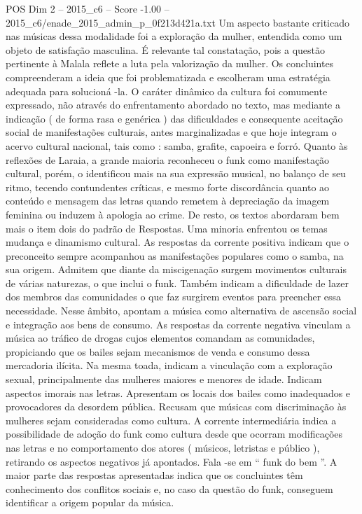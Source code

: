 \begin{textsample}{POS Dim 2 – 2015\_c6 – Score -1.00 – 2015\_c6/enade\_2015\_admin\_p\_0f213d421a.txt}
Um aspecto bastante criticado nas músicas dessa modalidade foi a exploração da mulher, entendida como um objeto de satisfação masculina.
É relevante tal constatação, pois a questão pertinente à Malala reflete a luta pela valorização da mulher.
Os concluintes compreenderam a ideia que foi problematizada e escolheram uma estratégia adequada para solucioná -la.
O caráter dinâmico da cultura foi comumente expressado, não através do enfrentamento abordado no texto, mas mediante a indicação ( de forma rasa e genérica ) das dificuldades e consequente aceitação social de manifestações culturais, antes marginalizadas e que hoje integram o acervo cultural nacional, tais como : samba, grafite, capoeira e forró.
Quanto às reflexões de Laraia, a grande maioria reconheceu o funk como manifestação cultural, porém, o identificou mais na sua expressão musical, no balanço de seu ritmo, tecendo contundentes críticas, e mesmo forte discordância quanto ao conteúdo e mensagem das letras quando remetem à depreciação da imagem feminina ou induzem à apologia ao crime.
De resto, os textos abordaram bem mais o item dois do padrão de Respostas.
Uma minoria enfrentou os temas mudança e dinamismo cultural.
As respostas da corrente positiva indicam que o preconceito sempre acompanhou as manifestações populares como o samba, na sua origem.
Admitem que diante da miscigenação surgem movimentos culturais de várias naturezas, o que inclui o funk.
Também indicam a dificuldade de lazer dos membros das comunidades o que faz surgirem eventos para preencher essa necessidade.
Nesse âmbito, apontam a música como alternativa de ascensão social e integração aos bens de consumo.
As respostas da corrente negativa vinculam a música ao tráfico de drogas cujos elementos comandam as comunidades, propiciando que os bailes sejam mecanismos de venda e consumo dessa mercadoria ilícita.
Na mesma toada, indicam a vinculação com a exploração sexual, principalmente das mulheres maiores e menores de idade.
Indicam aspectos imorais nas letras.
Apresentam os locais dos bailes como inadequados e provocadores da desordem pública.
Recusam que músicas com discriminação às mulheres sejam consideradas como cultura.
A corrente intermediária indica a possibilidade de adoção do funk como cultura desde que ocorram modificações nas letras e no comportamento dos atores ( músicos, letristas e público ), retirando os aspectos negativos já apontados.
Fala -se em “ funk do bem ”.
A maior parte das respostas apresentadas indica que os concluintes têm conhecimento dos conflitos sociais e, no caso da questão do funk, conseguem identificar a origem popular da música.

\end{textsample}
